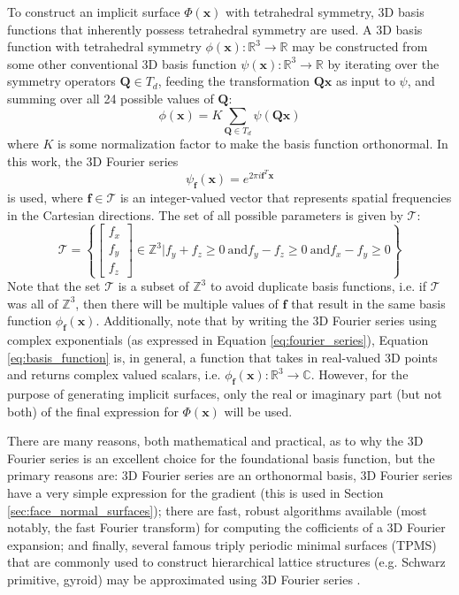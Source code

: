 \documentclass[acmtog]{acmart}
\begin{document}
To construct an implicit surface $\Phi(\mathbf{x})$ with tetrahedral symmetry, 3D basis functions that inherently possess tetrahedral symmetry are used. A 3D basis function with tetrahedral symmetry $\phi(\mathbf{x}): \mathbb{R}^3 \rightarrow \mathbb{R}$ may be constructed from some other conventional 3D basis function $\psi(\mathbf{x}): \mathbb{R}^3 \rightarrow \mathbb{R}$ by iterating over the symmetry operators $\mathbf{Q} \in T_d$, feeding the transformation $\mathbf{Qx}$ as input to $\psi$, and summing over all 24 possible values of $\mathbf{Q}$:
%
\begin{equation}
  \label{eq:basis_function}
  \phi(\mathbf{x}) = K \sum\limits_{\mathbf{Q} \in T_d} \psi(\mathbf{Qx})
\end{equation}
%
where $K$ is some normalization factor to make the basis function orthonormal. In this work, the 3D Fourier series
%
\begin{equation}
  \label{eq:fourier_series}
  \psi_{\mathbf{f}}(\mathbf{x}) = e^{2\pi i \mathbf{f}^T \mathbf{x}}
\end{equation}
%
is used, where $\mathbf{f} \in \mathcal{T}$ is an integer-valued vector that represents spatial frequencies in the Cartesian directions. The set of all possible parameters is given by $\mathcal{T}$:
%
\begin{equation}
  \mathcal{T} = \left\{ \begin{bmatrix} f_x \\ f_y \\ f_z \end{bmatrix} \in \mathbb{Z}^3 | f_y + f_z \geq 0 \: \text{and} f_y - f_z \geq 0 \: \text{and} f_x - f_y \geq 0 \right\}
\end{equation}
%
Note that the set $\mathcal{T}$ is a subset of $\mathbb{Z}^3$ to avoid duplicate basis functions, i.e. if $\mathcal{T}$ was all of $\mathbb{Z}^3$, then there will be multiple values of $\mathbf{f}$ that result in the same basis function $\phi_{\mathbf{f}}(\mathbf{x})$. Additionally, note that by writing the 3D Fourier series using complex exponentials (as expressed in Equation \ref{eq:fourier_series}), Equation \ref{eq:basis_function} is, in general, a function that takes in real-valued 3D points and returns complex valued scalars, i.e. $\phi_{\mathbf{f}}(\mathbf{x}): \mathbb{R}^3 \rightarrow \mathbb{C}$. However, for the purpose of generating implicit surfaces, only the real or imaginary part (but not both) of the final expression for $\Phi(\mathbf{x})$ will be used.

There are many reasons, both mathematical and practical, as to why the 3D Fourier series is an excellent choice for the foundational basis function, but the primary reasons are: 3D Fourier series are an orthonormal basis, 3D Fourier series have a very simple expression for the gradient (this is used in Section \ref{sec:face_normal_surfaces}); there are fast, robust algorithms available (most notably, the fast Fourier transform) for computing the cofficients of a 3D Fourier expansion; and finally, several famous triply periodic minimal surfaces (TPMS) that are commonly used to construct hierarchical lattice structures (e.g. Schwarz primitive, gyroid) may be approximated using 3D Fourier series \cite{wohlgemuth2001triply}.
\end{document}
